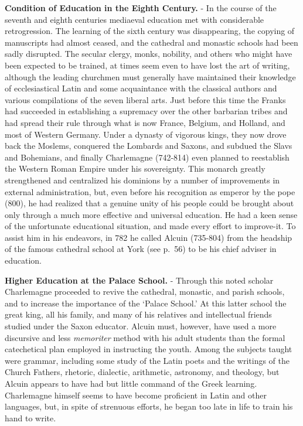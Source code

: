 \documentclass[
]{book}
\begin{document}
\textbf{Condition of Education in the Eighth Century.} - In the course of the seventh and eighth centuries mediaeval education met with considerable retrogression. The learning of the sixth century was disappearing, the copying of manuscripts had almost ceased, and the cathedral and monastic schools had been sadly disrupted. The secular clergy, monks, nobility, and others who might have been expected to be trained, at times seem even to have lost the art of writing, although the leading churchmen must generally have maintained their knowledge of ecclesiastical Latin and some acquaintance with the classical authors and various compilations of the seven liberal arts. Just before this time the Franks had succeeded in establishing a supremacy over the other barbarian tribes and had spread their rule through what is now France, Belgium, and Holland, and most of Western Germany. Under a dynasty of vigorous kings, they now drove back the Moslems, conquered the Lombards and Saxons, and subdued the Slavs and Bohemians, and finally Charlemagne (742-814) even planned to reestablish the Western Roman Empire under his sovereignty. This monarch greatly strengthened and centralized his dominions by a number of improvements in external administration, but, even before his recognition as emperor by the pope (800), he had realized that a genuine unity of his people could be brought about only through a much more effective and universal education. He had a keen sense of the unfortunate educational situation, and made every effort to improve-it. To assist him in his endeavors, in 782 he called Alcuin (735-804) from the headship of the famous cathedral school at York (see p.~56) to be his chief adviser in education.

\textbf{Higher Education at the Palace School.} - Through this noted scholar Charlemagne proceeded to revive the cathedral, monastic, and parish schools, and to increase the importance of the `Palace School.' At this latter school the great king, all his family, and many of his relatives and intellectual friends studied under the Saxon educator. Alcuin must, however, have used a more discursive and less \emph{memoriter} method with his adult students than the formal catechetical plan employed in instructing the youth. Among the subjects taught were grammar, including some study of the Latin poets and the writings of the Church Fathers, rhetoric, dialectic, arithmetic, astronomy, and theology, but Alcuin appears to have had but little command of the Greek learning. Charlemagne himself seems to have become proficient in Latin and other languages, but, in spite of strenuous efforts, he began too late in life to train his hand to write.
\end{document}
